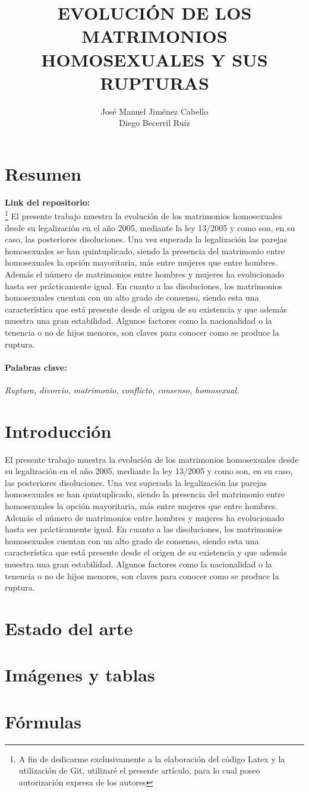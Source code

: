 \documentclass{article}
\begin{document}
	\title{\textbf{\Huge{EVOLUCIÓN DE LOS MATRIMONIOS HOMOSEXUALES Y SUS RUPTURAS}}}
	\author{José Manuel Jiménez Cabello \\ Diego Becerril Ruíz}
	\maketitle
	\newpage
	
	\tableofcontents
	\newpage
	
	\section{Resumen} 
	

\textbf{Link del repositorio:} \\

	\footnote[1]{A fin de dedicarme exclusivamente a la elaboración del código Latex y la utilización de Git, utilizaré el presente artículo, para lo cual poseo autorización expresa de los autores}
El presente trabajo muestra la evolución de los matrimonios homosexuales desde su legalización en el año 2005, mediante la ley 13/2005 y como son, en su caso, las posteriores disoluciones. Una vez superada la legalización las parejas homosexuales se han quintuplicado, siendo la presencia del matrimonio entre homosexuales la opción mayoritaria, más entre mujeres que entre hombres. Además el número de matrimonios entre hombres y mujeres ha evolucionado hasta ser prácticamente igual. En cuanto a las disoluciones, los matrimonios homosexuales cuentan con un alto grado de consenso, siendo esta una característica que está presente desde el origen de su existencia y que además muestra una gran estabilidad. Algunos factores como la nacionalidad o la tenencia o no de hijos menores, son claves para conocer como se produce la ruptura.
\paragraph{Palabras clave:}
 \textit{Ruptura, divorcio, matrimonio, conflicto, consenso, homosexual.}
\section{Introducción}
El presente trabajo muestra la evolución de los matrimonios homosexuales desde su legalización en el año 2005, mediante la ley 13/2005 y como son, en su caso, las posteriores disoluciones. Una vez superada la legalización las parejas homosexuales se han quintuplicado, siendo la presencia del matrimonio entre homosexuales la opción mayoritaria, más entre mujeres que entre hombres. Además el número de matrimonios entre hombres y mujeres ha evolucionado hasta ser prácticamente igual. En cuanto a las disoluciones, los matrimonios homosexuales cuentan con un alto grado de consenso, siendo esta una característica que está presente desde el origen de su existencia y que además muestra una gran estabilidad. Algunos factores como la nacionalidad o la tenencia o no de hijos menores, son claves para conocer como se produce la ruptura.
\section{Estado del arte}
\section{Imágenes y tablas}
\section{Fórmulas}
\end{document}
